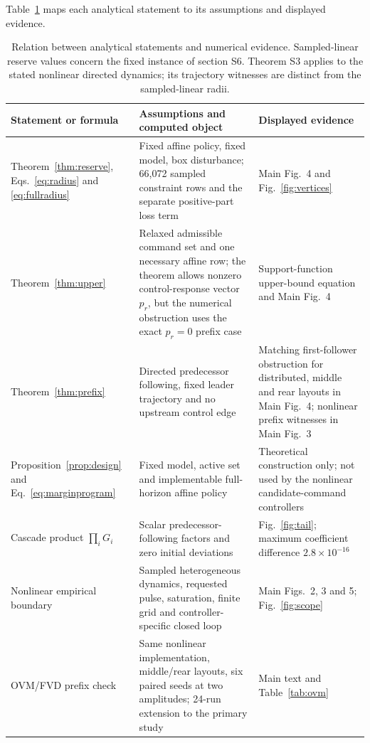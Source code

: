 \documentclass[11pt]{article}
\begin{document}
Table~\ref{tab:traceability} maps each analytical statement to its assumptions and displayed evidence.
\begin{table}[H]
\centering
\caption{Relation between analytical statements and numerical evidence. Sampled-linear reserve values concern the fixed instance of section S6. Theorem S3 applies to the stated nonlinear directed dynamics; its trajectory witnesses are distinct from the sampled-linear radii.}
\label{tab:traceability}
\small
\begin{tabularx}{\linewidth}{>{\raggedright\arraybackslash}p{.23\linewidth}>{\raggedright\arraybackslash}p{.27\linewidth}>{\raggedright\arraybackslash}X}
\toprule
Statement or formula & Assumptions and computed object & Displayed evidence\\
\midrule
Theorem~\ref{thm:reserve}, Eqs.~\eqref{eq:radius} and \eqref{eq:fullradius} & Fixed affine policy, fixed model, box disturbance; 66,072 sampled constraint rows and the separate positive-part loss term & Main Fig.~4 and Fig.~\ref{fig:vertices}\\
Theorem~\ref{thm:upper} & Relaxed admissible command set and one necessary affine row; the theorem allows nonzero control-response vector $p_r$, but the numerical obstruction uses the exact $p_r=0$ prefix case & Support-function upper-bound equation and Main Fig.~4\\
Theorem~\ref{thm:prefix} & Directed predecessor following, fixed leader trajectory and no upstream control edge & Matching first-follower obstruction for distributed, middle and rear layouts in Main Fig.~4; nonlinear prefix witnesses in Main Fig.~3\\
Proposition~\ref{prop:design} and Eq.~\eqref{eq:marginprogram} & Fixed model, active set and implementable full-horizon affine policy & Theoretical construction only; not used by the nonlinear candidate-command controllers\\
Cascade product $\prod_iG_i$ & Scalar predecessor-following factors and zero initial deviations & Fig.~\ref{fig:tail}; maximum coefficient difference $2.8\times10^{-16}$\\
Nonlinear empirical boundary & Sampled heterogeneous dynamics, requested pulse, saturation, finite grid and controller-specific closed loop & Main Figs.~2, 3 and 5; Fig.~\ref{fig:scope}\\
OVM/FVD prefix check & Same nonlinear implementation, middle/rear layouts, six paired seeds at two amplitudes; 24-run extension to the primary study & Main text and Table~\ref{tab:ovm}\\
\bottomrule
\end{tabularx}
\end{table}
\end{document}
